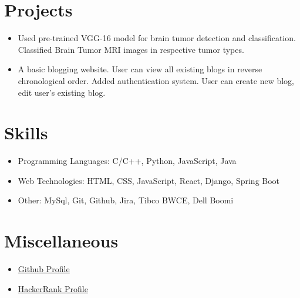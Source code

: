 \documentclass{resume}
\begin{document}
\section{Projects}
\begin{itemize}
 \item Used pre-trained VGG-16 model for brain tumor detection and classification. Classified Brain Tumor MRI images in respective tumor types.
\end{itemize}

 {}
\begin{itemize}
 \item A basic blogging website. User can view all existing blogs in reverse chronological order. Added authentication system. User can create new blog, edit user's existing blog.
\end{itemize}



\section{Skills}
\begin{itemize}[parsep=0.5ex]
  \item Programming Languages: C/C++, Python, JavaScript, Java
  \item Web Technologies: HTML, CSS, JavaScript, React, Django, Spring Boot
  \item Other: MySql, Git, Github, Jira, Tibco BWCE, Dell Boomi
\end{itemize}


\section{Miscellaneous}
\begin{itemize}[parsep=0.5ex]
  \item \href{https://github.com/AdityaKomawar}{Github Profile} 
  \item \href{https://www.hackerrank.com/adityakomawar7}{HackerRank Profile} 
\end{itemize}

%
%
\end{document}
